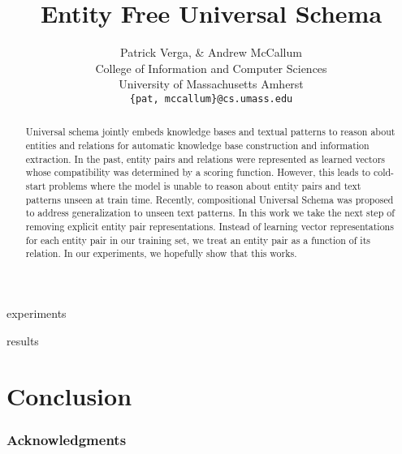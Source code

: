 \documentclass{article} %
\title{Entity Free Universal Schema}
\author{Patrick Verga, \& Andrew McCallum \\
College of Information and Computer Sciences\\
University of Massachusetts Amherst\\
\texttt{\{pat, mccallum\}@cs.umass.edu} \\
}
\begin{document}
\maketitle

\begin{abstract}
Universal schema jointly embeds knowledge bases and textual patterns to reason about entities and relations for automatic knowledge base construction and information extraction. In the past, entity pairs and relations were represented as learned vectors whose compatibility was determined by a scoring function. However, this leads to cold-start problems where the model is unable to reason about entity pairs and text patterns unseen at train time. Recently, compositional Universal Schema was proposed to address generalization to unseen text patterns. In this work we take the next step of removing explicit entity pair representations. Instead of learning vector representations for each entity pair in our training set, we treat an entity pair as a function of its relation. In our experiments, we hopefully show that this works.
\end{abstract}







 {experiments}

 {results}

\section{Conclusion}


\subsubsection*{Acknowledgments}




\newpage
%
\end{document}

